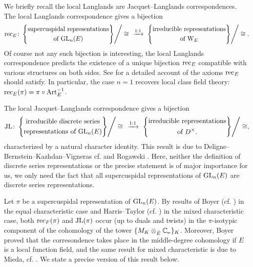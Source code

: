 \documentclass[../main.tex]{subfiles}
\begin{document}
We briefly recall the local Langlands are Jacquet--Langlands correspondences.
The local Langlands correspondence gives a bijection
\begin{equation*}
  \rec_E\colon \left\{
\begin{gathered}\text{supercuspidal representations} \\
\text{of $\GL_n(E)$}\end{gathered}\middle\}\right / \cong \ \ 
\xto{1:1} \  \left\{\begin{gathered}\text{irreducible representations} \\
\text{of $\Weil_E$} \end{gathered}\middle\}\right/\cong.
\end{equation*}
Of course not any such bijection is interesting, the local Langlands correspondence
predicts the existence of a unique bijection $\mathrm{rec}_E$ compatible with various
structures on both sides. See \cite[Section 12.4]{getz2023introduction} for a
detailed account of the axioms $\mathrm{rec}_E$ should satisfy.
In particular, the case $n=1$ recovers local class field theory: 
$\mathrm{rec}_E(\pi) = \pi \circ \operatorname{Art}_E^{-1}$. 

The local Jacquet--Langlands correspondence gives a bijection 
\begin{equation*}
  \JL\colon \left\{
\begin{gathered}\text{irreducible discrete series} \\
\text{representations of $\GL_n(E)$}\end{gathered}\middle\}\right / \cong \ \ 
\xto{1:1} \  \left\{\begin{gathered}\text{irreducible representations} \\
\text{of $D^\times$}. \end{gathered}\middle\}\right/\cong,
\end{equation*}
characterized by a natural character identity. This result is due to
Deligne--Bernstein--Kazhdan--Vigneras cf. \cite{deligne1984representations} and 
Rogawski \cite{rogawski1983representations}. Here, neither the definition of discrete
series representations or the precise statement is of major importance for us,
we only need the fact that all supercuspidal representations of $\operatorname{GL}_n(E)$ are
discrete series representations. 

Let $\pi$ be a supercuspidal representation of $\operatorname{GL}_n(E)$. 
By results of Boyer (cf. \cite{boyer1999mauvaise})
in the equal characteristic case and Harris--Taylor (cf. \cite{HTShimura}) in the 
mixed characteristic case, both $\mathrm{rec}_F(\pi)$ and $\mathrm{JL}(\pi)$ occur
(up to duals and twists) in the $\pi$-isotypic component of the cohomology of 
the tower $\{M_{K} \otimes_{\br E} \Cp\}_K$. 
Moreover, Boyer proved that the corresondence takes place in the middle-degree
cohomology if $E$ is a local function field, and the same result for 
mixed characteristic is due to Mieda, cf. \cite{mieda2010NonCusp}.
We state a precise version of this result below.
\end{document}
